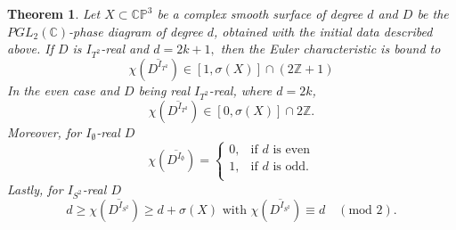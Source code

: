 \documentclass[10pt,a4paper]{amsart}
\newtheorem{theorem}{Theorem}
\newcommand{\C}{\mathbb{C}}
\newcommand{\p}{{\mathbb{P}}}
\begin{document}
\begin{theorem}\label{theorem_ec}
	Let $X\subset\C\p^3$ be a complex smooth surface of degree $d$ and $D$ be the $PGL_2(\mathbb{C})$-phase diagram of degree $d$, obtained with the initial data described above. If $D$ is ${I_{T^2}}$-real and $d=2k+1,$ then the Euler characteristic is bound to
	$$\chi(\overline{D^{I_{T^2}}})\in[1,\sigma(X)]\cap (2\mathbb{Z}+1)$$
	In the even case and $D$ being real ${I_{T^2}}$-real, where $d=2k$,
	$$\chi(\overline{D^{I_{T^2}}})\in[0,\sigma(X)]\cap 2\mathbb{Z}.$$
	Moreover, for $I_\emptyset$-real $D$ \[  \chi(\overline{D^{I_{\emptyset}}})=\left\{
	\begin{array}{ll}
		0, & \text{if } d \text{ is even} \\
		1, & \text{if } d \text{ is odd.} \\
	\end{array} 
	\right. \]
	Lastly, for $I_{S^2}$-real $D$ $$d\geq\chi(\overline{D^{I_{S^2}}})\geq d+\sigma(X)\text{ with }\chi(\overline{D^{I_{S^2}}})\equiv d \quad (\text{mod 2}).$$
\end{theorem}
\end{document}
